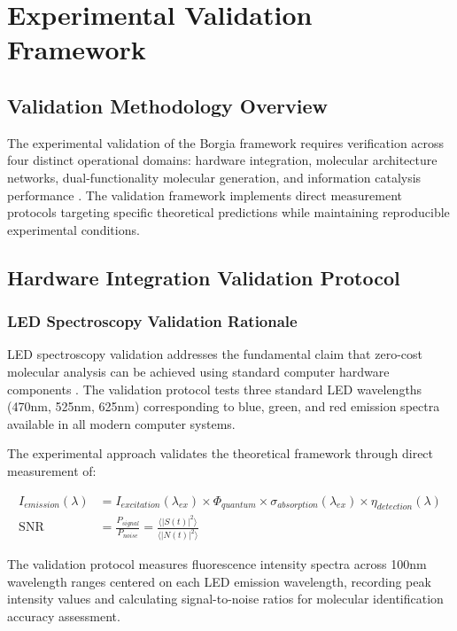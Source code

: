 \section{Experimental Validation Framework}

\subsection{Validation Methodology Overview}

The experimental validation of the Borgia framework requires verification across four distinct operational domains: hardware integration, molecular architecture networks, dual-functionality molecular generation, and information catalysis performance \cite{sachikonye2024oscillatory,sterling2015principles}. The validation framework implements direct measurement protocols targeting specific theoretical predictions while maintaining reproducible experimental conditions.

\subsection{Hardware Integration Validation Protocol}

\subsubsection{LED Spectroscopy Validation Rationale}

LED spectroscopy validation addresses the fundamental claim that zero-cost molecular analysis can be achieved using standard computer hardware components \cite{lakowicz2006principles}. The validation protocol tests three standard LED wavelengths (470nm, 525nm, 625nm) corresponding to blue, green, and red emission spectra available in all modern computer systems.

The experimental approach validates the theoretical framework through direct measurement of:

\begin{align}
I_{emission}(\lambda) &= I_{excitation}(\lambda_{ex}) \times \Phi_{quantum} \times \sigma_{absorption}(\lambda_{ex}) \times \eta_{detection}(\lambda) \\
\text{SNR} &= \frac{P_{signal}}{P_{noise}} = \frac{\langle |S(t)|^2 \rangle}{\langle |N(t)|^2 \rangle}
\end{align}

The validation protocol measures fluorescence intensity spectra across 100nm wavelength ranges centered on each LED emission wavelength, recording peak intensity values and calculating signal-to-noise ratios for molecular identification accuracy assessment.

